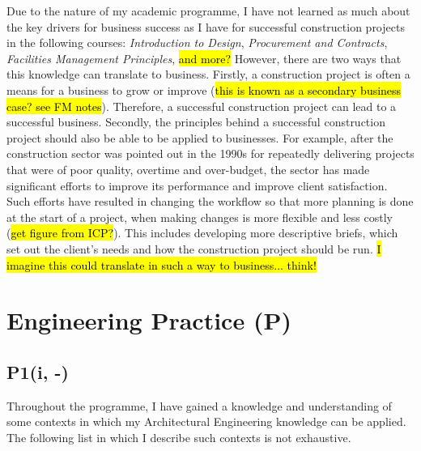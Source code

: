 Due to the nature of my academic programme, I have not learned as much about the key drivers for business success as I have for successful construction projects in the following courses:
\textit{Introduction to Design},
\textit{Procurement and Contracts},
\textit{Facilities Management Principles},
\hl{and more?}
However, there are two ways that this knowledge can translate to business.
Firstly, a construction project is often a means for a business to grow or improve (\hl{this is known as a secondary business case? see FM notes}).
Therefore, a successful construction project can lead to a successful business.
Secondly, the principles behind a successful construction project should also be able to be applied to businesses.
For example, after the construction sector was pointed out in the 1990s for repeatedly delivering projects that were of poor quality, overtime and over-budget, the sector has made significant efforts to improve its performance and improve client satisfaction.
Such efforts have resulted in changing the workflow so that more planning is done at the start of a project, when making changes is more flexible and less costly (\hl{get figure from ICP?}).
This includes developing more descriptive briefs, which set out the client's needs and how the construction project should be run.
\hl{I imagine this could translate in such a way to business... think!}



\section{Engineering Practice (P)}


\subsection*{P1(i, -)}

Throughout the programme, I have gained a knowledge and understanding of some contexts in which my Architectural Engineering knowledge can be applied.
The following list in which I describe such contexts is not exhaustive.

